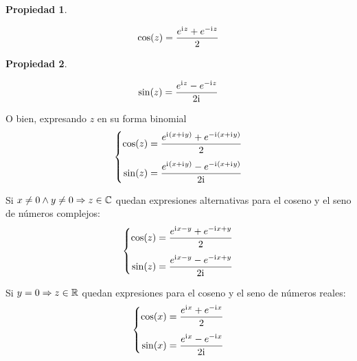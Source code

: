 \documentclass[a5paper,12pt,twoside]{book}
\newtheorem{prop}{{Propiedad}}[chapter]
\begin{document}
\begin{mdframed}[style=MyFrame1]
    \begin{prop}
    \end{prop}
    \begin{equation*}
        \cos(z) = \frac{e^{\mathrm{i}\mkern1mu z} + e^{-\mathrm{i}\mkern1mu z}}{2}
    \end{equation*}
\end{mdframed}

\begin{mdframed}[style=MyFrame1]
    \begin{prop}
    \end{prop}
    \begin{equation*}
        \sin(z) = \frac{e^{\mathrm{i}\mkern1mu z} - e^{-\mathrm{i}\mkern1mu z}}{2 \mathrm{i}\mkern1mu}
    \end{equation*}
\end{mdframed}

O bien, expresando $z$ en su forma binomial
\begin{equation*}
    \left\{
    \begin{aligned}
        \cos(z) = \frac{e^{\mathrm{i}\mkern1mu \left(x + \mathrm{i}\mkern1mu y \right)} + e^{-\mathrm{i}\mkern1mu \left(x + \mathrm{i}\mkern1mu y \right)}}{2}
        \\[1ex]
        \sin(z) = \frac{e^{\mathrm{i}\mkern1mu \left(x + \mathrm{i}\mkern1mu y \right)} - e^{-\mathrm{i}\mkern1mu \left(x+\mathrm{i}\mkern1mu y\right)}}{2 \mathrm{i}\mkern1mu}
    \end{aligned}
    \right.
\end{equation*}

Si $x \neq 0 \land y \neq 0 \Rightarrow z \in \mathbb{C}$ quedan expresiones alternativas para el coseno y el seno de números complejos:
\begin{equation*}
    \left\{
    \begin{aligned}
        \cos(z) &= \frac{e^{\mathrm{i}\mkern1mu x - y} + e^{-\mathrm{i}\mkern1mu x + y}}{2}
        \\[1ex]
        \sin(z) &= \frac{e^{\mathrm{i}\mkern1mu x - y} - e^{-\mathrm{i}\mkern1mu x + y}}{2\mathrm{i}\mkern1mu}
    \end{aligned}
    \right.
\end{equation*}

Si $y=0 \Rightarrow z \in \mathbb{R}$ quedan expresiones para el coseno y el seno de números reales:
\begin{equation*}
    \left\{
    \begin{aligned}
        \cos(x) &= \frac{e^{\mathrm{i}\mkern1mu x} + e^{-\mathrm{i}\mkern1mu x}}{2}
        \\[1ex]
        \sin(x) &= \frac{e^{\mathrm{i}\mkern1mu x} - e^{-\mathrm{i}\mkern1mu x}}{2\mathrm{i}\mkern1mu}
    \end{aligned}
    \right.
\end{equation*}
\end{document}
